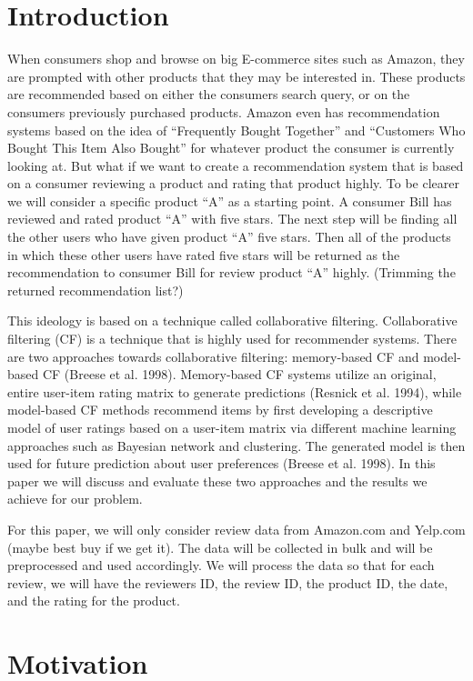 \documentclass[conference]{IEEEtran}
\begin{document}
\section{Introduction}

When consumers shop and browse on big E-commerce sites such as Amazon, they are prompted with other products that they may be interested in.  These products are recommended based on either the consumers search query, or on the consumers previously purchased products.  Amazon even has recommendation systems based on the idea of “Frequently Bought Together” and “Customers Who Bought This Item Also Bought” for whatever product the consumer is currently looking at.  
But what if we want to create a recommendation system that is based on a consumer reviewing a product and rating that product highly.  To be clearer we will consider a specific product “A” as a starting point.  A consumer Bill has reviewed and rated product “A” with five stars.  The next step will be finding all the other users who have given product “A” five stars.  Then all of the products in which these other users have rated five stars will be returned as the recommendation to consumer Bill for review product “A” highly.  (Trimming the returned recommendation list?)

This ideology is based on a technique called collaborative filtering.  Collaborative filtering (CF) is a technique that is highly used for recommender systems.  There are two approaches towards collaborative filtering: memory-based CF and model-based CF (Breese et al. 1998).  Memory-based CF systems utilize an original, entire user-item rating matrix to generate predictions (Resnick et al. 1994), while model-based CF methods recommend items by first developing a descriptive model of user ratings based on a user-item matrix via different machine learning approaches such as Bayesian network and clustering. The generated model is then used for future prediction about user preferences (Breese et al. 1998). In this paper we will discuss and evaluate these two approaches and the results we achieve for our problem.

For this paper, we will only consider review data from Amazon.com and Yelp.com (maybe best buy if we get it).  The data will be collected in bulk and will be preprocessed and used accordingly.  We will process the data so that for each review, we will have the reviewers ID, the review ID, the product ID,  the date, and the rating for the product.


\section{Motivation}
\end{document}

